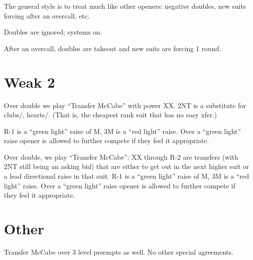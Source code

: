 \documentclass[main]{subfile}
\begin{document}
	The general style is to treat  much like other openers: negative doubles, new suits forcing after an overcall, etc.
	
	Doubles are ignored; systems on.
	
	After an overcall, doubles are takeout and new suits are forcing 1 round.
	
	\section{Weak 2}
	{
	Over double we play ``Transfer McCabe'' with power XX. 2NT is a substitute for clubs/, hearts/. (That is, the cheapest rank suit that has no easy xfer.)
	
	R-1 is a ``green light'' raise of M, 3M is a ``red light'' raise. Over a ``green light'' raise opener is allowed to further compete if they feel it appropriate.
	}
	{
	Over double, we play ``Transfer McCabe'': XX through R-2 are transfers (with 2NT still being an asking bid) that are either to get out in the next higher suit or a lead directional raise in that suit. R-1 is a ``green light'' raise of M, 3M is a ``red light'' raise. Over a ``green light'' raise opener is allowed to further compete if they feel it appropriate.
	}

	\section{Other}
	
	Transfer McCabe over 3 level preempts as well. No other special agreements.
	
\end{document}
